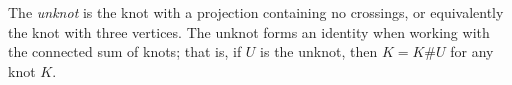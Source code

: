 \documentclass[12pt]{article}
\begin{document}
The \emph{unknot} is the knot with a projection containing no crossings, or equivalently the knot with three vertices. The unknot forms an identity when working with the connected sum of knots; that is, if $U$ is the unknot, then $K=K\#U$ for any knot $K$.
\end{document}
